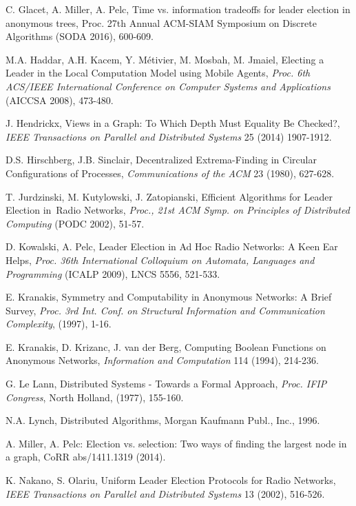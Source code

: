 \documentclass[a4paper,10pt]{article}
\begin{document}
\begin{thebibliography}{99}
C. Glacet, A. Miller, A. Pelc, Time vs. information tradeoffs for leader election in anonymous trees, Proc. 27th Annual ACM-SIAM Symposium on Discrete Algorithms (SODA 2016), 600-609.




M.A. Haddar, A.H. Kacem, Y. M\'{e}tivier, M. Mosbah, M. Jmaiel, Electing a Leader in the Local Computation Model using Mobile Agents,
{\em Proc.  6th ACS/IEEE International Conference on Computer Systems and Applications} (AICCSA 2008), 473-480.

J. Hendrickx, Views in a Graph: To Which Depth Must Equality Be Checked?,
{\em IEEE Transactions on Parallel and Distributed Systems} 25 (2014) 1907-1912.


D.S. Hirschberg, J.B. Sinclair,
Decentralized Extrema-Finding in Circular Configurations of Processes,
{\em Communications of the ACM} 23 (1980), 627-628.

T. Jurdzinski, M. Kutylowski, J. Zatopianski, 
Efficient Algorithms for Leader Election in~Radio Networks,
 {\em Proc., 21st ACM Symp. on Principles of Distributed Computing} (PODC 2002), 51-57.

D. Kowalski, A. Pelc, Leader Election in Ad Hoc Radio Networks: A Keen Ear Helps, 
{\em Proc. 36th International Colloquium on Automata, Languages and Programming} (ICALP 2009), LNCS 5556, 521-533. 


E. Kranakis,
Symmetry and Computability in Anonymous Networks: A Brief Survey,
{\em Proc. 3rd Int. Conf. on Structural Information and Communication Complexity}, (1997), 1-16.

E. Kranakis, D. Krizanc, J. van der Berg,
Computing Boolean Functions on Anonymous Networks,
{\em Information and Computation} 114 (1994), 214-236.

G. Le Lann,
Distributed Systems - Towards a Formal Approach,
{\em Proc. IFIP Congress}, North Holland, (1977), 155-160.

N.A. Lynch, 
Distributed Algorithms,
Morgan Kaufmann Publ., Inc., 1996.


A. Miller, A. Pelc: Election vs. selection: Two ways of finding the largest node in a graph,
CoRR abs/1411.1319 (2014).

K. Nakano, S. Olariu, Uniform Leader Election Protocols for Radio Networks,
{\em IEEE Transactions on Parallel and Distributed Systems} 13
(2002), 516-526.


\end{thebibliography}
\end{document}
